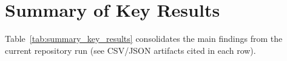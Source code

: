 \begin{table}[htbp]
\centering
\caption{Selected Models with Documented Intervals (bootstrap from \texttt{exp\_fewshot\_best.json}; Exp1 RF row is a point estimate from the fixed split).}
\small
{}
\label{tab:exp8_ci}
\end{table}

\section{Summary of Key Results}

Table~\ref{tab:summary_key_results} consolidates the main findings from the current repository run (see CSV/JSON artifacts cited in each row).

